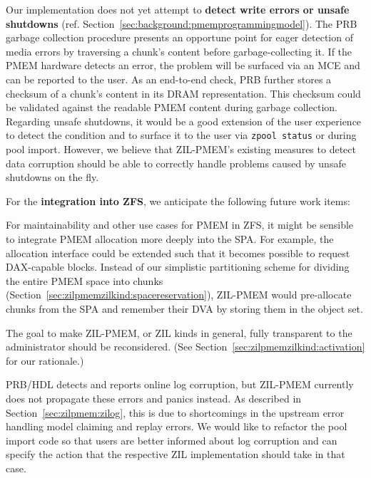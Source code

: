 \documentclass[12pt,a4paper,twoside]{book}
\begin{document}
{Our implementation does not yet attempt to \textbf{detect write errors or unsafe shutdowns} (ref. Section~\ref{sec:background:pmemprogrammingmodel}).
The PRB garbage collection procedure presents an opportune point for eager detection of media errors by traversing a chunk's content before garbage-collecting it.
If the PMEM hardware detects an error, the problem will be surfaced via an MCE and can be reported to the user.
As an end-to-end check, PRB further stores a checksum of a chunk's content in its DRAM representation. This checksum could be validated against the readable PMEM content during garbage collection.
Regarding unsafe shutdowns, it would be a good extension of the user experience to detect the condition and to surface it to the user via \lstinline{zpool status} or during pool import.
However, we believe that ZIL-PMEM's existing measures to detect data corruption should be able to correctly handle problems caused by unsafe shutdowns on the fly.

For the \textbf{integration into ZFS}, we anticipate the following future work items:
\begin{description}[noitemsep,leftmargin=1.5cm,labelindent=1cm]
    \item[PMEM Space Management] For maintainability and other use cases for PMEM in ZFS, it might be sensible to integrate PMEM allocation more deeply into the SPA.
        For example, the allocation interface could be extended such that it becomes possible to request DAX-capable blocks.
        Instead of our simplistic partitioning scheme for dividing the entire PMEM space into chunks (Section~\ref{sec:zilpmemzilkind:spacereservation}), ZIL-PMEM would pre-allocate chunks from the SPA and remember their DVA by storing them in the object set.

    \item[ZIL Kinds User Experience] The goal to make ZIL-PMEM, or ZIL kinds in general, fully transparent to the administrator should be reconsidered.
        (See Section~\ref{sec:zilpmemzilkind:activation} for our rationale.)

    \item[Handling Of Claiming And Replay Errors] PRB/HDL detects and reports online log corruption, but ZIL-PMEM currently does not propagate these errors and panics instead.
        As described in Section~\ref{sec:zilpmem:zilog}, this is due to shortcomings in the upstream error handling model claiming and replay errors.
        We would like to refactor the pool import code so that users are better informed about log corruption and can specify the action that the respective ZIL implementation should take in that case.


\end{description}}
\end{document}
